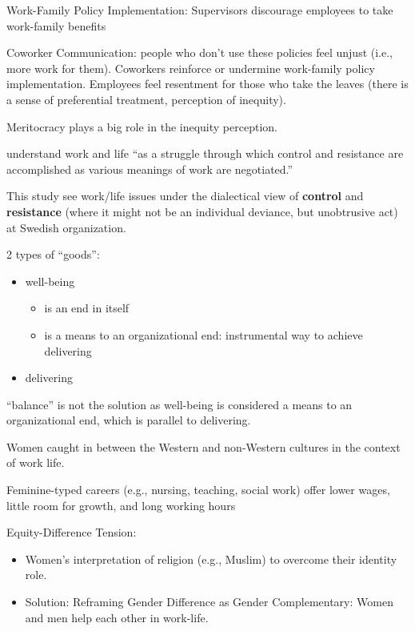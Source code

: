 \documentclass[
]{book}
\providecommand{\tightlist}{%
  \setlength{\itemsep}{0pt}\setlength{\parskip}{0pt}}
\begin{document}
Work-Family Policy Implementation: Supervisors discourage employees to take work-family benefits

Coworker Communication: people who don't use these policies feel unjust (i.e., more work for them). Coworkers reinforce
or undermine work-family policy implementation. Employees feel resentment for those who take the leaves (there is a
sense of preferential treatment, perception of inequity).

Meritocracy plays a big role in the inequity perception.

\citep{Wieland_2011}

understand work and life ``as a struggle through which control and resistance are accomplished as various meanings of
work are negotiated.''

This study see work/life issues under the dialectical view of \textbf{control} and \textbf{resistance} (where it might not be an
individual deviance, but unobtrusive act) at Swedish organization.

2 types of ``goods'':

\begin{itemize}
\item
  well-being

  \begin{itemize}
  \item
    is an end in itself
  \item
    is a means to an organizational end: instrumental way to achieve delivering
  \end{itemize}
\item
  delivering
\end{itemize}

``balance'' is not the solution as well-being is considered a means to an organizational end, which is parallel to
delivering.

\citep{D_Enbeau_2015}

Women caught in between the Western and non-Western cultures in the context of work life.

Feminine-typed careers (e.g., nursing, teaching, social work) offer lower wages, little room for growth, and long
working hours

Equity-Difference Tension:

\begin{itemize}
\tightlist
\item
  Women's interpretation of religion (e.g., Muslim) to overcome their identity role.
\item
  Solution: Reframing Gender Difference as Gender Complementary: Women and men help each other in work-life.
\end{itemize}
\end{document}
